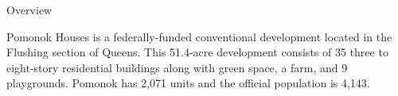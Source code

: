 Overview 

Pomonok Houses is a federally-funded conventional development located in the Flushing section of Queens. This 51.4-acre development consists of 35 three to eight-story residential buildings along with green space, a farm, and 9 playgrounds. Pomonok has 2,071 units and the official population is 4,143. 